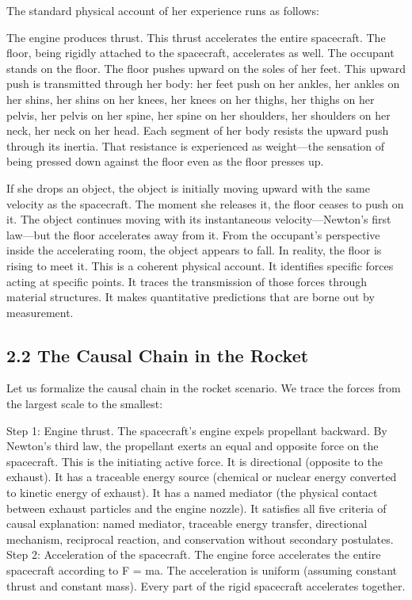 \documentclass[11pt]{article}
\begin{document}
The standard physical account of her experience runs as follows:

The engine produces thrust. This thrust accelerates the entire spacecraft. The floor, being rigidly attached to the spacecraft, accelerates as well. The occupant stands on the floor. The floor pushes upward on the soles of her feet. This upward push is transmitted through her body: her feet push on her ankles, her ankles on her shins, her shins on her knees, her knees on her thighs, her thighs on her pelvis, her pelvis on her spine, her spine on her shoulders, her shoulders on her neck, her neck on her head. Each segment of her body resists the upward push through its inertia. That resistance is experienced as weight---the sensation of being pressed down against the floor even as the floor presses up.

If she drops an object, the object is initially moving upward with the same velocity as the spacecraft. The moment she releases it, the floor ceases to push on it. The object continues moving with its instantaneous velocity---Newton's first law---but the floor accelerates away from it. From the occupant's perspective inside the accelerating room, the object appears to fall. In reality, the floor is rising to meet it. This is a coherent physical account. It identifies specific forces acting at specific points. It traces the transmission of those forces through material structures. It makes quantitative predictions that are borne out by measurement.

\subsection{2.2 The Causal Chain in the Rocket}

Let us formalize the causal chain in the rocket scenario. We trace the forces from the largest scale to the smallest:

Step 1: Engine thrust. The spacecraft's engine expels propellant backward. By Newton's third law, the propellant exerts an equal and opposite force on the spacecraft. This is the initiating active force. It is directional (opposite to the exhaust). It has a traceable energy source (chemical or nuclear energy converted to kinetic energy of exhaust). It has a named mediator (the physical contact between exhaust particles and the engine nozzle). It satisfies all five criteria of causal explanation: named mediator, traceable energy transfer, directional mechanism, reciprocal reaction, and conservation without secondary postulates. Step 2: Acceleration of the spacecraft. The engine force accelerates the entire spacecraft according to F = ma. The acceleration is uniform (assuming constant thrust and constant mass). Every part of the rigid spacecraft accelerates together.
\end{document}
